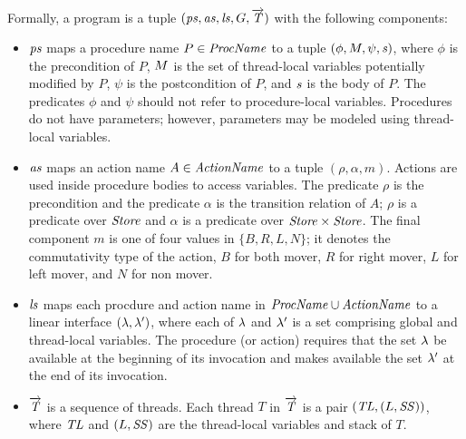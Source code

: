 Formally, a \civl program is a tuple $(\mathit{ps}, \mathit{as}, \mathit{ls}, G, \overrightarrow{\mathit{T}})$ with the following components:
\begin{itemize}
\item 
$\mathit{ps}$ maps a procedure name $P \in \mathit{ProcName}$ to a tuple $(\phi, M, \psi, \mathit{s})$, 
where $\phi$ is the precondition of $P$, $M$ is the set of thread-local variables potentially modified by $P$, 
$\psi$ is the postcondition of $P$, and $\mathit{s}$ is the body of $P$.
The predicates $\phi$ and $\psi$ should not refer to procedure-local variables.
Procedures do not have parameters; however, parameters may be modeled using thread-local variables.
\item
$\mathit{as}$ maps an action name $A \in \mathit{ActionName}$ to a tuple $(\rho,\alpha,m)$.
Actions are used inside procedure bodies to access variables.
The predicate $\rho$ is the precondition and the predicate $\alpha$ is the transition relation of $A$;
$\rho$ is a predicate over $\mathit{Store}$ and $\alpha$ is a predicate over $\mathit{Store} \times \mathit{Store}$.
The final component $m$ is one of four values in $\{B,R,L,N\}$;
it denotes the commutativity type of the action, $B$ for both mover, $R$ for right mover, $L$ for left mover, 
and $N$ for non mover. 
\item
$\mathit{ls}$ maps each procdure and action name in $\mathit{ProcName} \cup \mathit{ActionName}$ to a linear interface 
$(\lambda,\lambda')$, where each of $\lambda$ and $\lambda'$ is a set comprising global and thread-local variables.
The procedure (or action) requires that the set $\lambda$ be available at the beginning of its invocation 
and makes available the set $\lambda'$ at the end of its invocation.
\item
$\overrightarrow{\mathit{T}}$ is a sequence of threads.
Each thread $T$ in $\overrightarrow{\mathit{T}}$ is a pair $(\mathit{TL}, (L, \mathit{SS}))$, where $\mathit{TL}$ and $(L, \mathit{SS})$ 
are the thread-local variables and stack of $T$.
\end{itemize}




